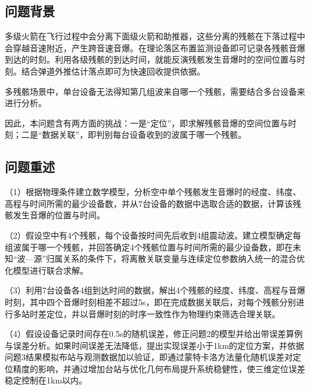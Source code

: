 \documentclass[12pt,a4paper]{article}
\begin{document}
\subsection{问题背景}

多级火箭在飞行过程中会分离下面级火箭和助推器，这些分离的残骸在下落过程中会穿越音速附近，产生跨音速音爆。在理论落区布置监测设备即可记录各残骸音爆到达的时刻。利用各级残骸的到达时间，就能反演残骸发生音爆时的空间位置与时刻。结合弹道外推估计落点即可为快速回收提供依据。

多残骸场景中，单台设备无法得知第几组波来自哪一个残骸，需要结合多台设备来进行分析。

因此，本问题含有两方面的挑战：一是“定位”，即求解残骸音爆的空间位置与时刻；二是“数据关联”，即判别每台设备收到的波属于哪一个残骸。

\subsection{问题重述}

（1）根据物理条件建立数学模型，分析空中单个残骸发生音爆时的经度、纬度、高程与时间所需的最少设备数，并从7台设备的数据中选取合适的数据，计算该残骸发生音爆的位置与时间。

（2）假设空中有4个残骸，每个设备按时间先后收到4组震动波。建立模型确定每组波属于哪一个残骸，并回答确定4个残骸位置与时间所需的最少设备数，即在未知“波—源”归属关系的条件下，将离散关联变量与连续定位参数纳入统一的混合优化模型进行联合求解。

（3）利用7台设备各4组到达时间的数据，解出4个残骸的经度、纬度、高程与音爆时刻，其中四个音爆时刻相差不超过5s，即在完成数据关联后，对每个残骸分别进行多站时差定位，并以音爆时刻的时序一致性作为物理约束筛选合理关联。

（4）假设设备记录时间存在0.5s的随机误差，修正问题2的模型并给出带误差算例与误差分析。如果时间误差无法降低，提出实现误差小于1km的定位方案，并依据问题3结果模拟布站与观测数据加以验证，即通过蒙特卡洛方法量化随机误差对定位精度的影响，并通过增加台站与优化几何布局提升系统稳健性，使三维定位误差稳定控制在1km以内。

\end{document}
